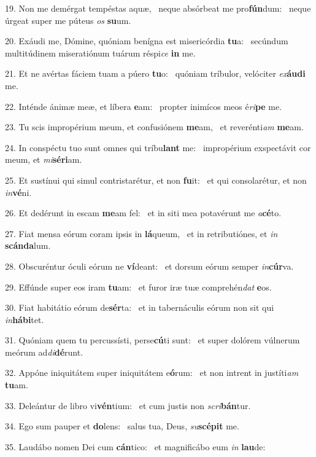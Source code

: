 19. Non me demérgat tempéstas aquæ, \dag\  neque absórbeat me pro\textbf{fún}dum: \ast\  neque úrgeat super me púteus \textit{os} \textbf{su}um.\

20. Exáudi me, Dómine, quóniam benígna est misericórdia \textbf{tu}a: \ast\  secúndum multitúdinem miseratiónum tuárum réspi\textit{ce} \textbf{in} me.\

21. Et ne avértas fáciem tuam a púero \textbf{tu}o: \ast\  quóniam tríbulor, velóciter \textit{ex}\textbf{áu}\textbf{di} me.\

22. Inténde ánimæ meæ, et líbera \textbf{e}am: \ast\  propter inimícos meos é\textit{ri}\textbf{pe} me.\

23. Tu scis impropérium meum, et confusiónem \textbf{me}am, \ast\  et reverénti\textit{am} \textbf{me}am.\

24. In conspéctu tuo sunt omnes qui tríbu\textbf{lant} me: \ast\  impropérium exspectávit cor meum, et \textit{mi}\textbf{sé}\textbf{ri}am.\

25. Et sustínui qui simul contristarétur, et non \textbf{fu}it: \ast\  et qui consolarétur, et non \textit{in}\textbf{vé}ni.\

26. Et dedérunt in escam \textbf{me}am fel: \ast\  et in siti mea potavérunt me \textit{a}\textbf{cé}to.\

27. Fiat mensa eórum coram ipsis in \textbf{lá}queum, \ast\  et in retributiónes, et \textit{in} \textbf{scán}\textbf{da}lum.\

28. Obscuréntur óculi eórum ne \textbf{ví}deant: \ast\  et dorsum eórum semper \textit{in}\textbf{cúr}va.\

29. Effúnde super eos iram \textbf{tu}am: \ast\  et furor iræ tuæ comprehén\textit{dat} \textbf{e}os.\

30. Fiat habitátio eórum de\textbf{sér}ta: \ast\  et in tabernáculis eórum non sit qui \textit{in}\textbf{há}\textbf{bi}tet.\

31. Quóniam quem tu percussísti, perse\textbf{cú}ti sunt: \ast\  et super dolórem vúlnerum meórum ad\textit{di}\textbf{dé}runt.\

32. Appóne iniquitátem super iniquitátem e\textbf{ó}rum: \ast\  et non intrent in justíti\textit{am} \textbf{tu}am.\

33. Deleántur de libro vi\textbf{vén}tium: \ast\  et cum justis non \textit{scri}\textbf{bán}tur.\

34. Ego sum pauper et \textbf{do}lens: \ast\  salus tua, Deus, \textit{su}\textbf{scé}\textbf{pit} me.\

35. Laudábo nomen Dei cum \textbf{cán}tico: \ast\  et magnificábo eum \textit{in} \textbf{lau}de:\

